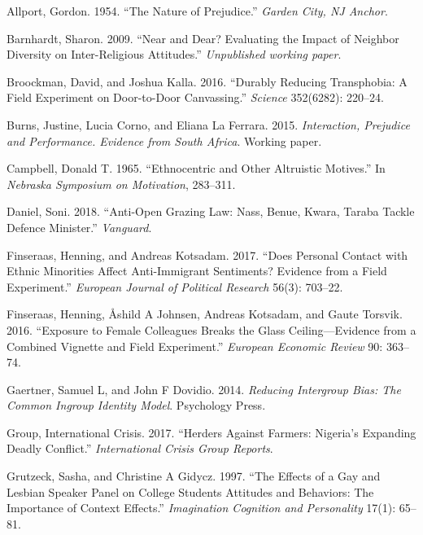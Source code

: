 \documentclass[11pt]{article}
\begin{document}
\hypertarget{refs}{}
\hypertarget{ref-allport1954prejudice}{}
Allport, Gordon. 1954. ``The Nature of Prejudice.'' \emph{Garden City,
NJ Anchor}.

\hypertarget{ref-barnhardt2009near}{}
Barnhardt, Sharon. 2009. ``Near and Dear? Evaluating the Impact of
Neighbor Diversity on Inter-Religious Attitudes.'' \emph{Unpublished
working paper}.

\hypertarget{ref-broockman2016durably}{}
Broockman, David, and Joshua Kalla. 2016. ``Durably Reducing
Transphobia: A Field Experiment on Door-to-Door Canvassing.''
\emph{Science} 352(6282): 220--24.

\hypertarget{ref-burns2015interaction}{}
Burns, Justine, Lucia Corno, and Eliana La Ferrara. 2015.
\emph{Interaction, Prejudice and Performance. Evidence from South
Africa}. Working paper.

\hypertarget{ref-campbell1965ethno}{}
Campbell, Donald T. 1965. ``Ethnocentric and Other Altruistic Motives.''
In \emph{Nebraska Symposium on Motivation}, 283--311.

\hypertarget{ref-daniel2018anti}{}
Daniel, Soni. 2018. ``Anti-Open Grazing Law: Nass, Benue, Kwara, Taraba
Tackle Defence Minister.'' \emph{Vanguard}.

\hypertarget{ref-finseraas2017does}{}
Finseraas, Henning, and Andreas Kotsadam. 2017. ``Does Personal Contact
with Ethnic Minorities Affect Anti-Immigrant Sentiments? Evidence from a
Field Experiment.'' \emph{European Journal of Political Research} 56(3):
703--22.

\hypertarget{ref-finseraas2016women}{}
Finseraas, Henning, Åshild A Johnsen, Andreas Kotsadam, and Gaute
Torsvik. 2016. ``Exposure to Female Colleagues Breaks the Glass
Ceiling---Evidence from a Combined Vignette and Field Experiment.''
\emph{European Economic Review} 90: 363--74.

\hypertarget{ref-gaertner2014reducing}{}
Gaertner, Samuel L, and John F Dovidio. 2014. \emph{Reducing Intergroup
Bias: The Common Ingroup Identity Model}. Psychology Press.

\hypertarget{ref-icg2017herder}{}
Group, International Crisis. 2017. ``Herders Against Farmers: Nigeria's
Expanding Deadly Conflict.'' \emph{International Crisis Group Reports}.

\hypertarget{ref-grutzeck1997effects}{}
Grutzeck, Sasha, and Christine A Gidycz. 1997. ``The Effects of a Gay
and Lesbian Speaker Panel on College Students Attitudes and Behaviors:
The Importance of Context Effects.'' \emph{Imagination Cognition and
Personality} 17(1): 65--81.
\end{document}
